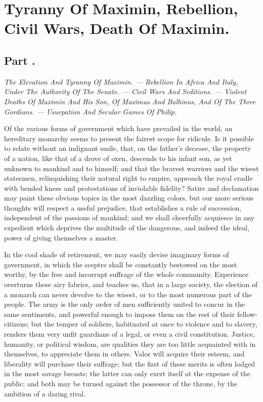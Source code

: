 \chapter{Tyranny Of Maximin, Rebellion, Civil Wars, Death Of Maximin.}
\section{Part \thesection.}

\textit{The Elevation And Tyranny Of Maximin. — Rebellion In Africa And
Italy, Under The Authority Of The Senate. — Civil Wars And
Seditions. — Violent Deaths Of Maximin And His Son, Of Maximus And
Balbinus, And Of The Three Gordians. — Usurpation And Secular Games
Of Philip.}
\vspace{\onelineskip}

Of the various forms of government which have prevailed in the
world, an hereditary monarchy seems to present the fairest scope
for ridicule. Is it possible to relate without an indignant
smile, that, on the father’s decease, the property of a nation,
like that of a drove of oxen, descends to his infant son, as yet
unknown to mankind and to himself; and that the bravest warriors
and the wisest statesmen, relinquishing their natural right to
empire, approach the royal cradle with bended knees and
protestations of inviolable fidelity? Satire and declamation may
paint these obvious topics in the most dazzling colors, but our
more serious thoughts will respect a useful prejudice, that
establishes a rule of succession, independent of the passions of
mankind; and we shall cheerfully acquiesce in any expedient which
deprives the multitude of the dangerous, and indeed the ideal,
power of giving themselves a master.

In the cool shade of retirement, we may easily devise imaginary
forms of government, in which the sceptre shall be constantly
bestowed on the most worthy, by the free and incorrupt suffrage
of the whole community. Experience overturns these airy fabrics,
and teaches us, that in a large society, the election of a
monarch can never devolve to the wisest, or to the most numerous
part of the people. The army is the only order of men
sufficiently united to concur in the same sentiments, and
powerful enough to impose them on the rest of their
fellow-citizens; but the temper of soldiers, habituated at once
to violence and to slavery, renders them very unfit guardians of
a legal, or even a civil constitution. Justice, humanity, or
political wisdom, are qualities they are too little acquainted
with in themselves, to appreciate them in others. Valor will
acquire their esteem, and liberality will purchase their
suffrage; but the first of these merits is often lodged in the
most savage breasts; the latter can only exert itself at the
expense of the public; and both may be turned against the
possessor of the throne, by the ambition of a daring rival.

